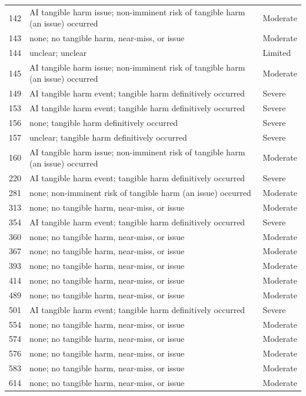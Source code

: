 \documentclass[11pt]{article}
\begin{document}
{\begin{longtable}{@{}r p{8.6cm} l@{}}
142 & AI tangible harm issue; non-imminent risk of tangible harm (an issue) occurred & Moderate \\
143 & none; no tangible harm, near-miss, or issue & Moderate \\
144 & unclear; unclear & Limited \\
145 & AI tangible harm issue; non-imminent risk of tangible harm (an issue) occurred & Moderate \\
149 & AI tangible harm event; tangible harm definitively occurred & Severe \\
153 & AI tangible harm event; tangible harm definitively occurred & Severe \\
156 & none; tangible harm definitively occurred & Severe \\
157 & unclear; tangible harm definitively occurred & Severe \\
160 & AI tangible harm issue; non-imminent risk of tangible harm (an issue) occurred & Moderate \\
220 & AI tangible harm event; tangible harm definitively occurred & Severe \\
281 & none; non-imminent risk of tangible harm (an issue) occurred & Moderate \\
313 & none; no tangible harm, near-miss, or issue & Moderate \\
354 & AI tangible harm event; tangible harm definitively occurred & Severe \\
360 & none; no tangible harm, near-miss, or issue & Moderate \\
367 & none; no tangible harm, near-miss, or issue & Moderate \\
393 & none; no tangible harm, near-miss, or issue & Moderate \\
414 & none; no tangible harm, near-miss, or issue & Moderate \\
489 & none; no tangible harm, near-miss, or issue & Moderate \\
501 & AI tangible harm event; tangible harm definitively occurred & Severe \\
554 & none; no tangible harm, near-miss, or issue & Moderate \\
574 & none; no tangible harm, near-miss, or issue & Moderate \\
576 & none; no tangible harm, near-miss, or issue & Moderate \\
583 & none; no tangible harm, near-miss, or issue & Moderate \\
614 & none; no tangible harm, near-miss, or issue & Moderate \\
\end{longtable}}
\end{document}
